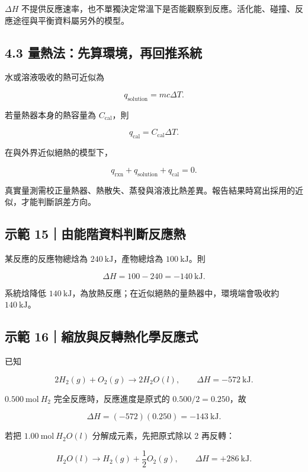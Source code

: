 \documentclass[11pt,a4paper]{article}
\begin{document}
\(\Delta H\) 不提供反應速率，也不單獨決定常溫下是否能觀察到反應。活化能、碰撞、反應途徑與平衡資料屬另外的模型。

\subsection{4.3 量熱法：先算環境，再回推系統}\label{ux91cfux71b1ux6cd5ux5148ux7b97ux74b0ux5883ux518dux56deux63a8ux7cfbux7d71}

水或溶液吸收的熱可近似為

\[
q_{\mathrm{solution}}=mc\Delta T.
\]

若量熱器本身的熱容量為 \(C_{\mathrm{cal}}\)，則

\[
q_{\mathrm{cal}}=C_{\mathrm{cal}}\Delta T.
\]

在與外界近似絕熱的模型下，

\[
q_{\mathrm{rxn}}+q_{\mathrm{solution}}+q_{\mathrm{cal}}=0.
\]

真實量測需校正量熱器、熱散失、蒸發與溶液比熱差異。報告結果時寫出採用的近似，才能判斷誤差方向。

\begin{HandoutWorkedExample}

\subsection{示範 15｜由能階資料判斷反應熱}\label{ux793aux7bc4-15ux7531ux80fdux968eux8cc7ux6599ux5224ux65b7ux53cdux61c9ux71b1}

某反應的反應物總焓為 \(240\ \mathrm{kJ}\)，產物總焓為 \(100\ \mathrm{kJ}\)。則

\[
\Delta H=100-240=-140\ \mathrm{kJ}.
\]

系統焓降低 \(140\ \mathrm{kJ}\)，為放熱反應；在近似絕熱的量熱器中，環境端會吸收約 \(140\ \mathrm{kJ}\)。

\end{HandoutWorkedExample}

\begin{HandoutWorkedExample}

\subsection{示範 16｜縮放與反轉熱化學反應式}\label{ux793aux7bc4-16ux7e2eux653eux8207ux53cdux8f49ux71b1ux5316ux5b78ux53cdux61c9ux5f0f}

已知

\[
2H_2(g)+O_2(g)\rightarrow2H_2O(l),
\qquad\Delta H=-572\ \mathrm{kJ}.
\]

\(0.500\ \mathrm{mol}\ H_2\) 完全反應時，反應進度是原式的 \(0.500/2=0.250\)，故

\[
\Delta H=(-572)(0.250)=-143\ \mathrm{kJ}.
\]

若把 \(1.00\ \mathrm{mol}\ H_2O(l)\) 分解成元素，先把原式除以 2 再反轉：

\[
H_2O(l)\rightarrow H_2(g)+\frac12O_2(g),
\qquad\Delta H=+286\ \mathrm{kJ}.
\]

\end{HandoutWorkedExample}
\end{document}
